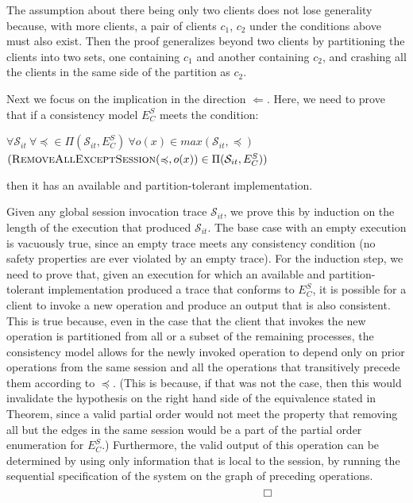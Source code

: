\documentclass[journal, compsoc]{IEEEtran}
\begin{document}
	The assumption about there being only two clients does not lose generality because, with more clients, a pair of clients $c_1$, $c_2$ under the conditions above must also exist. Then the proof generalizes beyond two clients by partitioning the clients into two sets, one containing $c_1$ and another containing $c_2$, and crashing all the clients in the same side of the partition as $c_2$.
	
	Next we focus on the implication in the direction $\Leftarrow$. Here, we need to prove that if a consistency model $E^S_C$ meets the condition:
	
	\noindent $\forall \mathcal{S}_{it} ~ \forall \preccurlyeq \in \Pi(\mathcal{S}_{it},E^S_C) ~ \forall o(x) \in max(\mathcal{S}_{it}, \preccurlyeq)$\\ \noindent $(\textsc{RemoveAllExceptSession}(\preccurlyeq,o(x)) \in \Pi(\mathcal{S}_{it},E^S_C)) $
	
	\noindent then it has an available and partition-tolerant implementation.
	
	
	
	Given any global session invocation trace $\mathcal{S}_{it}$, we prove this by induction on the length of the execution that produced $\mathcal{S}_{it}$. The base case with an empty execution is vacuously true, since an empty trace meets any consistency condition (no safety properties are ever violated by an empty trace). For the induction step, we need to prove that, given an execution for which an available and partition-tolerant implementation produced a trace that conforms to $E^S_C$, it is possible for a client to invoke a new operation and produce an output that is also consistent. This is true because, even in the case that the client that invokes the new operation is partitioned from all or a subset of the remaining processes, the consistency model allows for the newly invoked operation to depend only on prior operations from the same session and all the operations that transitively precede them according to $\preccurlyeq$. (This is because, if that was not the case, then this would invalidate the hypothesis on the right hand side of the equivalence stated in Theorem, since a valid partial order would not meet the property that removing all but the edges in the same session would be a part of the partial order enumeration for $E^S_C$.)  Furthermore, the valid output of this operation can be determined by using only information that is local to the session, by running the sequential specification of the system on the graph of preceding operations. ~~~~~~~~~~~~~~~~~~~~~~~~~~~~~~~~~~~~~~~~~~~~~ $\Box$
	
\end{document}
